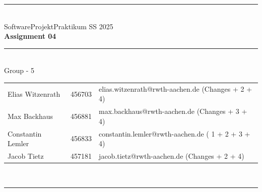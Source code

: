 \documentclass[a4paper,12pt]{article}
\begin{document}
\begin{center}
	\rule{\textwidth}{0.1pt}\\[1cm]
	
	\Large SoftwareProjektPraktikum SS 2025\\\bf Assignment 04
\end{center}


\begin{center}

	\rule{\textwidth}{0.1pt}\\[0.5cm]

	{\Large Group - 5\\[5mm]} %

	\begin{tabular}{lll}
		Elias Witzenrath & 456703 & elias.witzenrath@rwth-aachen.de (Changes + 2 + 4) \\

		Max Backhaus & 456881 & max.backhaus@rwth-aachen.de (Changes + 3 + 4)\\

		Constantin Lemler & 456833 & constantin.lemler@rwth-aachen.de ( 1 + 2 + 3 + 4) \\

        Jacob Tietz & 457181 & jacob.tietz@rwth-aachen.de (Changes + 2 + 4)\\

	\end{tabular}\\[0.5cm]

	\rule{\textwidth}{0.1pt}\\[1cm]

\end{center}






\end{document}
